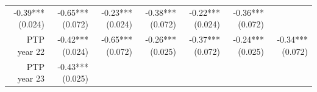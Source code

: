 \documentclass[]{article}
\begin{document}
\begin{longtable}[c]{@{}rrrrrrr@{}}
\begin{minipage}[t]{0.11\columnwidth}
-0.39*** (0.024)
\strut\end{minipage} &
\begin{minipage}[t]{0.12\columnwidth}\raggedleft\strut
-0.65*** (0.072)
\strut\end{minipage} &
\begin{minipage}[t]{0.11\columnwidth}\raggedleft\strut
-0.23*** (0.024)
\strut\end{minipage} &
\begin{minipage}[t]{0.12\columnwidth}\raggedleft\strut
-0.38*** (0.072)
\strut\end{minipage} &
\begin{minipage}[t]{0.11\columnwidth}\raggedleft\strut
-0.22*** (0.024)
\strut\end{minipage} &
\begin{minipage}[t]{0.11\columnwidth}\raggedleft\strut
-0.36*** (0.072)
\strut\end{minipage}\tabularnewline
\begin{minipage}[t]{0.12\columnwidth}\raggedleft\strut
PTP year 22
\strut\end{minipage} &
\begin{minipage}[t]{0.11\columnwidth}\raggedleft\strut
-0.42*** (0.024)
\strut\end{minipage} &
\begin{minipage}[t]{0.12\columnwidth}\raggedleft\strut
-0.65*** (0.072)
\strut\end{minipage} &
\begin{minipage}[t]{0.11\columnwidth}\raggedleft\strut
-0.26*** (0.025)
\strut\end{minipage} &
\begin{minipage}[t]{0.12\columnwidth}\raggedleft\strut
-0.37*** (0.072)
\strut\end{minipage} &
\begin{minipage}[t]{0.11\columnwidth}\raggedleft\strut
-0.24*** (0.025)
\strut\end{minipage} &
\begin{minipage}[t]{0.11\columnwidth}\raggedleft\strut
-0.34*** (0.072)
\strut\end{minipage}\tabularnewline
\begin{minipage}[t]{0.12\columnwidth}\raggedleft\strut
PTP year 23
\strut\end{minipage} &
\begin{minipage}[t]{0.11\columnwidth}\raggedleft\strut
-0.43*** (0.025)
\strut\end{minipage} &
\begin{minipage}[t]{0.12\columnwidth}\raggedleft\strut

\end{minipage}
\end{longtable}
\end{document}
